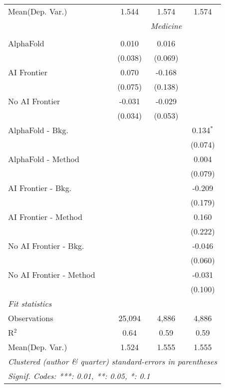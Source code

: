 \begin{tabular}{lccc}
Mean(Dep. Var.) & 1.544 & 1.574 & 1.574 \\
 & \multicolumn{3}{c}{\textit{Medicine}} \\ \\
   AlphaFold               & 0.010   & 0.016   &   \\   
                           & (0.038) & (0.069) &   \\   
   AI Frontier             & 0.070   & -0.168  &   \\   
                           & (0.075) & (0.138) &   \\   
   No AI Frontier          & -0.031  & -0.029  &   \\   
                           & (0.034) & (0.053) &   \\   
   AlphaFold - Bkg.        &         &         & 0.134$^{*}$\\   
                           &         &         & (0.074)\\   
   AlphaFold - Method      &         &         & 0.004\\   
                           &         &         & (0.079)\\   
   AI Frontier - Bkg.      &         &         & -0.209\\   
                           &         &         & (0.179)\\   
   AI Frontier - Method    &         &         & 0.160\\   
                           &         &         & (0.222)\\   
   No AI Frontier - Bkg.   &         &         & -0.046\\   
                           &         &         & (0.060)\\   
   No AI Frontier - Method &         &         & -0.031\\   
                           &         &         & (0.100)\\   
   \midrule
   \emph{Fit statistics}\\
   Observations            & 25,094  & 4,886   & 4,886\\  
   R$^2$                   & 0.64    & 0.59    & 0.59\\  
Mean(Dep. Var.) & 1.524 & 1.555 & 1.555 \\
   \midrule \midrule
   \multicolumn{4}{l}{\emph{Clustered (author \& quarter) standard-errors in parentheses}}\\
   \multicolumn{4}{l}{\emph{Signif. Codes: ***: 0.01, **: 0.05, *: 0.1}}\\
\end{tabular}
\par\endgroup
